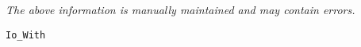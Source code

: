 \label{pkg:io\_with}

{\tiny \it The above information is manually maintained and may contain errors.}
\begin{verbatim}
Io_With
\end{verbatim}

